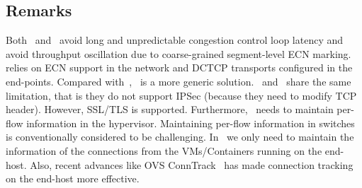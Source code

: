 \subsection{Remarks}
Both~\dem{} and~\spring{} avoid long and unpredictable congestion control loop latency and avoid throughput oscillation due to 
coarse-grained segment-level ECN marking.~\dem{} relies on ECN support in the network and DCTCP transports configured in
the end-points. Compared with~\dem{},~\spring{} is a more generic solution.~\dem{} and~\spring{} share the same limitation, that is
they do not support IPSec (because they need to modify TCP header). However, SSL/TLS is supported. 
Furthermore,~\spring{} needs to maintain per-flow information in the hypervisor. 
Maintaining per-flow information in switches is conventionally considered to be challenging.
In~\spring{} we only need to maintain the information of the connections from the VMs/Containers running on the end-host. 
Also, recent advances like OVS ConnTrack~\cite{ovs-conntrack} has made connection tracking on the end-host more effective.

